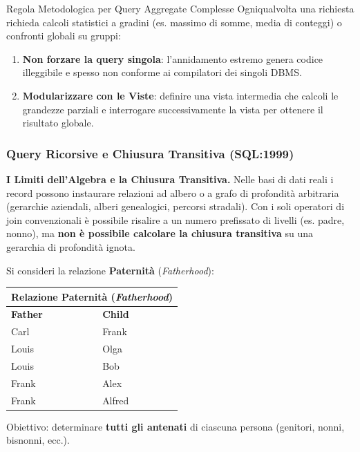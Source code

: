 \documentclass[12pt]{extarticle}
\begin{document}
\begin{cbox}{Regola Metodologica per Query Aggregate Complesse}
\noindent Ogniqualvolta una richiesta richieda calcoli statistici a gradini (es. massimo di somme, media di conteggi) o confronti globali su gruppi:
\begin{enumerate}
    \item \textbf{Non forzare la query singola}: l'annidamento estremo genera codice illeggibile e spesso non conforme ai compilatori dei singoli DBMS.
    \item \textbf{Modularizzare con le Viste}: definire una vista intermedia che calcoli le grandezze parziali e interrogare successivamente la vista per ottenere il risultato globale.
\end{enumerate}
\end{cbox}

\subsubsection{Query Ricorsive e Chiusura Transitiva (SQL:1999)}
\noindent \textbf{I Limiti dell'Algebra e la Chiusura Transitiva.} Nelle basi di dati reali i record possono instaurare relazioni ad albero o a grafo di profondità arbitraria (gerarchie aziendali, alberi genealogici, percorsi stradali). Con i soli operatori di join convenzionali è possibile risalire a un numero prefissato di livelli (es. padre, nonno), ma \textbf{non è possibile calcolare la chiusura transitiva} su una gerarchia di profondità ignota.

\medskip
\noindent Si consideri la relazione \textbf{Paternità} (\textit{Fatherhood}):
\begin{center}
\small
\begin{tabular}{ll}
    \toprule
    \multicolumn{2}{c}{\textbf{Relazione Paternità (\textit{Fatherhood})}} \\
    \midrule
    \textbf{Father} & \textbf{Child} \\
    \midrule
    Carl  & Frank \\
    Louis & Olga \\
    Louis & Bob \\
    Frank & Alex \\
    Frank & Alfred \\
    \bottomrule
\end{tabular}
\end{center}
Obiettivo: determinare \textbf{tutti gli antenati} di ciascuna persona (genitori, nonni, bisnonni, ecc.).
\end{document}
